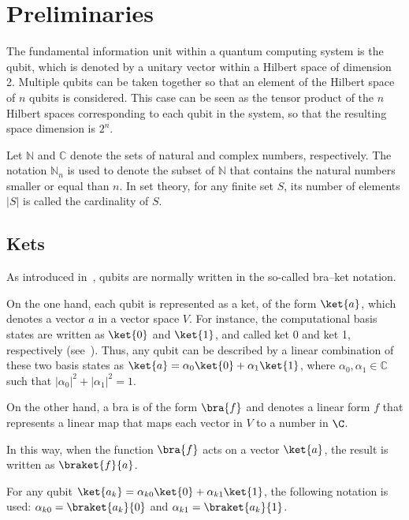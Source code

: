 \section{Preliminaries}
The fundamental information unit within a quantum computing system is the qubit, which is denoted by a unitary vector within a Hilbert space of dimension 2.
Multiple qubits can be taken together so that an element of the Hilbert space of $n$ qubits is considered. This case can be seen as the tensor product of the $n$ Hilbert spaces corresponding to each qubit in the system, so that the resulting space dimension is $2^n$.

Let $\mathbb{N}$ and $\mathbb{C}$ denote the sets of natural and complex numbers, respectively. The notation $\mathbb{N}_n$ is used to denote the subset of $\mathbb{N}$ that contains the natural numbers smaller or equal than $n$.
In set theory, for any finite set $S$, its number of elements  $|S|$ is called the cardinality of $S$.

\subsection{Kets}

As introduced in~\cite{diracBraket},  qubits are normally written in the so-called bra–ket notation.

On the one hand, each qubit is represented as a ket, of the form $\ket{a}$,  which denotes a vector $a$ in a vector space $V$.
For instance, the computational basis states are written  as $\ket{0}$ and $\ket{1}$, and called ket 0 and ket 1, respectively (see~\cite{Nielsen_Chuang_2010}).
Thus, any qubit can be described by a linear combination of these two basis states as $\ket{a} =\alpha_0\ket{0} +\alpha_1 \ket{1}$, where $\alpha_0,  \alpha_1 \in \mathbb{C}$ such that $ |\alpha_0|^{2}+|\alpha_1|^{2}=1$.

On the other hand, a bra is of the form $\bra{f}$ and denotes a linear form $f$ that represents a linear map that maps each vector in $V$
to a number in $\C$.

In this way,  when the function $\bra{f}$ acts on a vector $\ket{a}$, the result  is written as $\braket{f}{a}$.

\begin{notation}
    For any qubit $\ket{a_k}=\alpha_{k0}\ket{0} +\alpha_{k1} \ket{1}$, the following notation is used:
    $\alpha_{k0}=\braket{a_k}{0}$ and $\alpha_{k1}=\braket{a_k}{1}$.
\end{notation}

